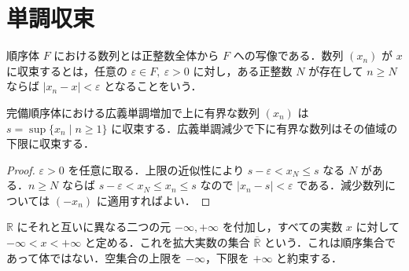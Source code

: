 \section{単調収束}
\begin{defn}[順序体における数列の収束]
順序体 $F$ における数列とは正整数全体から $F$ への写像である．数列 $(x_n)$ が $x$ に収束するとは，任意の $\varepsilon\in F,\ \varepsilon>0$ に対し，ある正整数 $N$ が存在して $n\geq N$ ならば $|x_n-x|<\varepsilon$ となることをいう．
\end{defn}
\begin{prop}[単調有界数列の収束]
完備順序体における広義単調増加で上に有界な数列 $(x_n)$ は $s=\sup\{x_n\mid n\geq1\}$ に収束する．広義単調減少で下に有界な数列はその値域の下限に収束する．
\end{prop}
\begin{proof}
$\varepsilon>0$ を任意に取る．上限の近似性により $s-\varepsilon<x_N\leq s$ なる $N$ がある．$n\geq N$ ならば $s-\varepsilon<x_N\leq x_n\leq s$ なので $|x_n-s|<\varepsilon$ である．減少数列については $(-x_n)$ に適用すればよい．
\end{proof}
\begin{defn}[拡大実数]
$\mathbb R$ にそれと互いに異なる二つの元 $-\infty,+\infty$ を付加し，すべての実数 $x$ に対して $-\infty<x<+\infty$ と定める．これを拡大実数の集合 $\overline{\mathbb R}$ という．これは順序集合であって体ではない．空集合の上限を $-\infty$，下限を $+\infty$ と約束する．
\end{defn}
